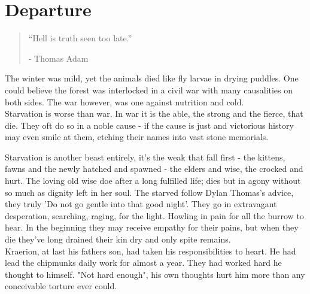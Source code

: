 \chapter{Departure}

\vspace{-1.3cm}
\begin{localsize}{10}
	\begin{quote}
		
	
	“Hell is truth seen too late.”
	\begin{flushright}- Thomas Adam \end{flushright}
	\end{quote} 
\end{localsize}
\vspace{1cm}


The winter was mild, yet the animals died like fly larvae in drying puddles. One could believe the forest was interlocked in a civil war with many causalities on both sides. The war however, was one against nutrition and cold. \\

Starvation is worse than war. In war it is the able, the strong and the fierce, that die. They oft do so in a noble cause - if the cause is just and victorious history may even smile at them, etching their names into vast stone memorials. 

Starvation is another beast entirely, it's the weak that fall first - the kittens, fawns and the newly hatched and spawned - the elders and wise, the crocked and hurt. The loving old wise doe after a long fulfilled life; dies but in agony without so much as dignity left in her soul. The starved follow Dylan Thomas's advice, they truly 'Do not go gentle into that good night'. They go in extravagant desperation, searching, raging, for the light. Howling in pain for all the burrow to hear. In the beginning they may receive empathy for their pains, but when they die they've long drained their kin dry and only spite remains.\\

Kraerion, at last his fathers son, had taken his responsibilities to heart. He had lead the chipmunks daily work for almost a year. They had worked hard he thought to himself. "Not hard enough", his own thoughts hurt him more than any conceivable torture ever could. 

